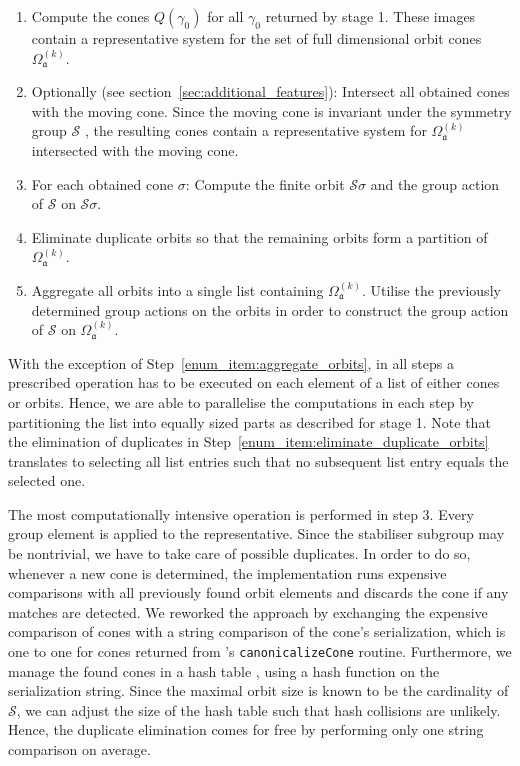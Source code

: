 \begin{enumerate}
	\item Compute the cones $Q(\gamma_0)$ for all \afaces{} $\gamma_0$ returned by stage 1. These images contain a representative system for the set of full dimensional orbit cones $\Omega_\mathfrak{a}^{(k)}$. 
	\item Optionally (see section~\ref{sec:additional_features}): Intersect all obtained cones with the moving cone. Since the moving cone is invariant under the symmetry group $\mathcal{S}$ , the resulting cones contain a representative system for $\Omega_\mathfrak{a}^{(k)}$ intersected with the moving cone.
	\item For each obtained cone $\sigma$: Compute the finite orbit $\mathcal{S}\sigma$ and the group action of $\mathcal{S}$ on $\mathcal{S}\sigma$. \label{enum_item:compute_orbit_cone_orbits}
	\item Eliminate duplicate orbits so that the remaining orbits form a partition of $\Omega_\mathfrak{a}^{(k)}$. \label{enum_item:eliminate_duplicate_orbits}
	\item Aggregate all orbits into a single list containing $\Omega_\mathfrak{a}^{(k)}$. Utilise the previously determined group actions on the orbits in order to construct the group action of $\mathcal{S}$ on $\Omega_\mathfrak{a}^{(k)}$. \label{enum_item:aggregate_orbits}
\end{enumerate}

With the exception of Step~\ref{enum_item:aggregate_orbits}, in all steps a prescribed operation has to be executed on each element of a list of either cones or orbits. Hence, we are able to parallelise the computations in each step by partitioning the list into equally sized parts as described for stage 1. Note that the elimination of duplicates in Step~\ref{enum_item:eliminate_duplicate_orbits} translates to selecting all list entries such that no subsequent list entry equals the selected one.

The most computationally intensive operation is performed in step 3. Every group element is applied to the representative. Since the stabiliser subgroup may be nontrivial, we have to take care of possible duplicates. In order to do so, whenever a new cone is determined, the \gitfanlib{} implementation runs expensive comparisons with all previously found orbit elements and discards the cone if any matches are detected. We reworked the approach by
exchanging the expensive comparison of cones with a string comparison of the cone's serialization, which is one to one for cones returned from \singular's \texttt{canonicalizeCone} routine. Furthermore, we manage the found cones in a hash table , using a hash function on the serialization string. Since the maximal orbit size is known to be the cardinality of $\mathcal{S}$, we can adjust the size of the hash table such that hash collisions are unlikely. Hence, the duplicate elimination comes for free by performing only one string comparison on average.

